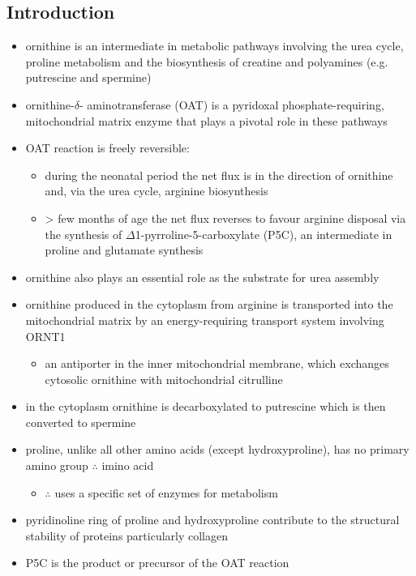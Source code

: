 \documentclass{scrartcl}
\begin{document}
\subsection{Introduction}
\label{sec:orgda4fab0}
\begin{itemize}
\item ornithine is an intermediate in metabolic pathways involving the
urea cycle, proline metabolism and the biosynthesis of creatine and
polyamines (e.g. putrescine and spermine)
\item ornithine-\(\delta\)- aminotransferase (OAT) is a pyridoxal
phosphate-requiring, mitochondrial matrix enzyme that plays a
pivotal role in these pathways
\item OAT reaction is freely reversible:
\begin{itemize}
\item during the neonatal period the net flux is in the direction of
ornithine and, via the urea cycle, arginine biosynthesis
\item \textgreater{} few months of age the net flux reverses to favour arginine
disposal via the synthesis of \(\Delta\)1-pyrroline-5-carboxylate
(P5C), an intermediate in proline and glutamate synthesis
\end{itemize}
\item ornithine also plays an essential role as the substrate for urea assembly
\item ornithine produced in the cytoplasm from arginine is transported
into the mitochondrial matrix by an energy-requiring transport
system involving ORNT1
\begin{itemize}
\item an antiporter in the inner mitochondrial membrane, which exchanges
cytosolic ornithine with mitochondrial citrulline
\end{itemize}
\item in the cytoplasm ornithine is decarboxylated to putrescine which is
then converted to spermine
\item proline, unlike all other amino acids (except hydroxyproline), has
no primary amino group \(\therefore\) imino acid
\begin{itemize}
\item \(\therefore\) uses a specific set of enzymes for metabolism
\end{itemize}
\item pyridinoline ring of proline and hydroxyproline contribute to the
structural stability of proteins particularly collagen
\item P5C is the product or precursor of the OAT reaction

\end{itemize}
\end{document}
